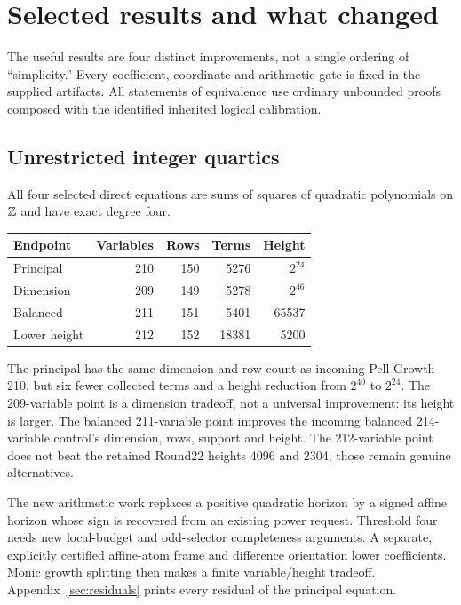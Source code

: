 \section{Selected results and what changed}
\label{sec:results}
The useful results are four distinct improvements, not a single ordering
of ``simplicity.'' Every coefficient, coordinate and arithmetic gate is
fixed in the supplied artifacts. All statements of equivalence use ordinary
unbounded proofs composed with the identified inherited logical calibration.

\subsection{Unrestricted integer quartics}
All four selected direct equations are sums of squares of quadratic
polynomials on $\mathbb Z$ and have exact degree four.
\begin{center}\small
\begin{tabular}{@{}lrrrr@{}}\toprule
Endpoint & Variables & Rows & Terms & Height\\\midrule
Principal &210&150&5276&$2^{24}$\\
Dimension &209&149&5278&$2^{46}$\\
Balanced &211&151&5401&65537\\
Lower height &212&152&18381&5200\\\bottomrule
\end{tabular}
\end{center}
The principal has the same dimension and row count as incoming Pell Growth
210, but six fewer collected terms and a height reduction from $2^{40}$ to
$2^{24}$. The 209-variable point is a dimension tradeoff, not a universal
improvement: its height is larger. The balanced 211-variable point improves
the incoming balanced 214-variable control's dimension, rows, support and
height. The 212-variable point does not beat the retained Round22 heights
4096 and 2304; those remain genuine alternatives.

The new arithmetic work replaces a positive quadratic horizon by a signed
affine horizon whose sign is recovered from an existing power request.
Threshold four needs new local-budget and odd-selector completeness
arguments. A separate, explicitly certified affine-atom frame and difference
orientation lower coefficients. Monic growth splitting then makes a finite
variable/height tradeoff. Appendix~\ref{sec:residuals} prints every residual
of the principal equation.

